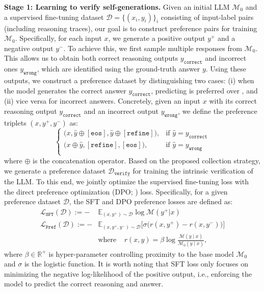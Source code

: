 \textbf{Stage 1: Learning to verify self-generations.} 
Given an initial LLM $\mathcal{M}_0$ and a supervised fine-tuning dataset $\mathcal{D}=\{(x_i, y_i)\}_{i}$ consisting of input-label pairs (including reasoning traces), our goal is to construct preference pairs for training $\mathcal{M}_0$. Specifically, for each input $x$, we generate a positive output $y^{+}$ and a negative output $y^{-}$.
To achieve this, we first sample multiple responses from $\mathcal{M}_0$. This allows us to obtain both correct reasoning outputs $y_{\mathtt{correct}}$ and incorrect ones $y_{\mathtt{wrong}}$, which are identified using the ground-truth answer $y$. Using these outputs, we construct a preference dataset by distinguishing two cases: (i) when the model generates the correct answer $y_{\mathtt{correct}}$, predicting \eos is preferred over \rethink, and (ii) vice versa for incorrect answers.
Concretely, given an input $x$ with its correct reasoning output $y_{\mathtt{correct}}$ and an incorrect output $y_{\mathtt{wrong}}$, we define the preference triplets $(x, y^+, y^-)$ as:
\[
\begin{cases}
\big(x, \hat{y}\oplus[\mathtt{eos}], \hat{y}\oplus[\mathtt{refine}]\big), & \text{if } \hat{y}=y_{\mathtt{correct}}\\
%
\big(x\oplus\hat{y}, [\mathtt{refine}], [\mathtt{eos}]\big), & \text{if } \hat{y}=y_{\mathtt{wrong}}\\
\end{cases} 
\]
where $\oplus$ is the concatenation operator.
Based on the proposed collection strategy, we generate a preference dataset $\mathcal{D}_\mathtt{verify}$ for training the intrinsic verification of the LLM. 
To this end, we jointly optimize the supervised fine-tuning loss with the direct preference optimization (DPO; \citealp{rafailov2023DPO}) loss. Specifically, for a given preference dataset $\mathcal{D}$, the SFT and DPO preference losses are defined as:
\begin{align*}
    \mathcal{L}_{\mathtt{SFT}}(\mathcal{D}):=-
    &\mathbb{E}_{(x,y^{+})\sim\mathcal{D}}\log\mathcal{M}(y^{+}|x)\\
    \mathcal{L}_{\mathtt{Pref}}(\mathcal{D}) := - 
    &\mathbb{E}_{(x,y^{+},y^{-})\sim \mathcal{D}} \Big[ \sigma\big( r(x,y^{+}) - r(x,y^{-})\big)\Big] 
    \\
    &\text{where} ~~~~~r(x,y)= \beta\log\frac{\mathcal{M}(y \mid x)}{\mathcal{M}_{0}(y \mid x)},
\end{align*}
where $\beta\in\mathbb{R}^{+}$ is hyper-parameter controlling proximity to the base model $\mathcal{M}_{0}$ and $\sigma$ is the logistic function. It is worth noting that SFT loss only focuses on minimizing the negative log-likelihood of the positive output, i.e., enforcing the model to predict the correct reasoning and answer.

